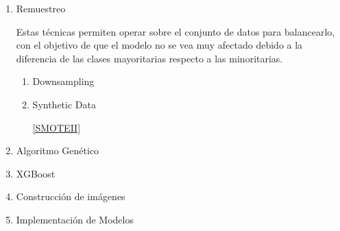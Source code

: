 \begin{enumerate}
\begin{enumerate}
                    La siguiente fase en cualquier modelo de  es la separación de datos (\textit{split}). Esta fase consiste en dividir el conjunto total de datos en al menos dos subconjuntos, uno de entrenamiento y otro de test. El modelo se entrenará en base a los datos de entrenamiento y se evaluará con los datos de test, los resultados sobre este conjunto permitirán comparar los modelos en base a las predicciones sobre las muestras que nunca han visto.\\


                    !!!!!!Comúnmente la proporción de datos de entrenamiento y test está establecida en un 0.8, en la figura \ref{DataSplitImage} se muestra una representación visual de esta división.!!!!!!!! 


                    \begin{figure}[h]
                        \centering
                        \texttt{[image: archivos/Datos/DataSplitImage.png]}
                        \caption{https://towardsdatascience.com/train-test-split-and-cross-validation-in-python-80b61beca4b6. División de un conjunto de datos en datos de entrenamiento y test.}
                        \label{DataSplitImage}
                     \end{figure}

            \end{enumerate}

        \item Remuestreo

            

            Estas técnicas permiten operar sobre el conjunto de datos para balancearlo, con el objetivo de que el modelo no se vea muy afectado debido a la diferencia de las clases mayoritarias respecto a las minoritarias.
            \begin{enumerate}

                \item Downsampling

                \item Synthetic Data

                    \ref{SMOTEII}

            \end{enumerate}

        \item Algoritmo Genético
            \cite{GAXGBoost}

        \item XGBoost

        \item Construcción de imágenes

            \cite{TASPCNN}

        \item Implementación de Modelos

            \cite{AutoSklearn}

    \end{enumerate}

